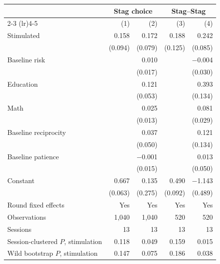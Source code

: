 \small
\begin{tabular}{lrrrr}
\toprule
 & \multicolumn{2}{c}{Stag choice} & \multicolumn{2}{c}{Stag--Stag} \\
\cmidrule(lr){2-3} \cmidrule(lr){4-5}
 & (1) & (2) & (3) & (4) \\
\midrule
Stimulated & 0.158 & 0.172 & 0.188 & 0.242 \\
 & (0.094) & (0.079) & (0.125) & (0.085) \\
Baseline risk &  & 0.010 &  & $-$0.004 \\
 &  & (0.017) &  & (0.030) \\
Education &  & 0.121 &  & 0.393 \\
 &  & (0.053) &  & (0.134) \\
Math &  & 0.025 &  & 0.081 \\
 &  & (0.013) &  & (0.029) \\
Baseline reciprocity &  & 0.037 &  & 0.121 \\
 &  & (0.050) &  & (0.134) \\
Baseline patience &  & $-$0.001 &  & 0.013 \\
 &  & (0.015) &  & (0.050) \\
Constant & 0.667 & 0.135 & 0.490 & $-$1.143 \\
 & (0.063) & (0.275) & (0.092) & (0.489) \\
\midrule
Round fixed effects & Yes & Yes & Yes & Yes \\
Observations & 1,040 & 1,040 & 520 & 520 \\
Sessions & 13 & 13 & 13 & 13 \\
Session-clustered $P$, stimulation & 0.118 & 0.049 & 0.159 & 0.015 \\
Wild bootstrap $P$, stimulation & 0.147 & 0.075 & 0.186 & 0.038 \\
\bottomrule
\end{tabular}

